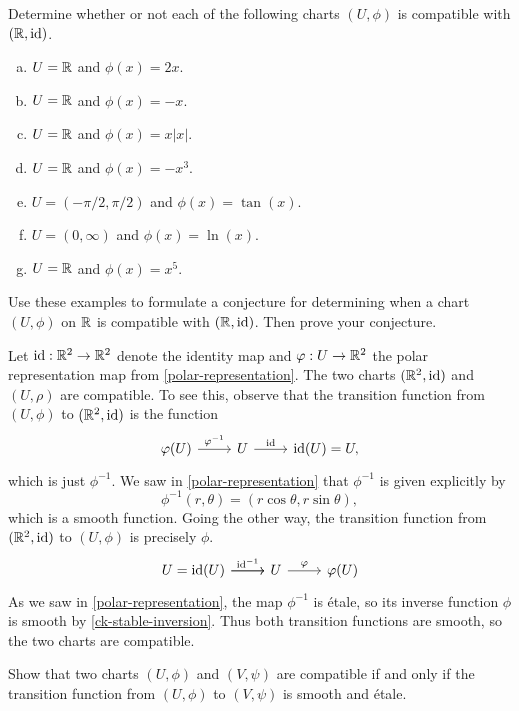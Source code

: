 \begin{exercise}
	Determine whether or not each of the following charts $(U, \phi)$ is compatible with $(\mathbb{R}, \mathrm{id})$.
	\begin{enumerate}[(a)]
		\item $U = \mathbb{R}$ and $\phi(x) = 2x$.
		\item $U = \mathbb{R}$ and $\phi(x) = -x$. 
		\item $U = \mathbb{R}$ and $\phi(x) = x|x|$. 
		\item $U = \mathbb{R}$ and $\phi(x) = -x^3$. 
		\item $U = (-\pi/2, \pi/2)$ and $\phi(x) = \tan(x)$. 
		\item $U = (0, \infty)$ and $\phi(x) = \ln(x)$. 
		\item $U = \mathbb{R}$ and $\phi(x) = x^5$. 
	\end{enumerate}
	Use these examples to formulate a conjecture for determining when a chart $(U, \phi)$ on $\mathbb{R}$ is compatible with $(\mathbb{R}, \mathrm{id})$. Then prove your conjecture. 
\end{exercise}

\begin{example} \label{polar-compatible-with-identity}
	Let $\mathrm{id} : \mathbb{R}^2 \to \mathbb{R}^2$ denote the identity map and $\varphi : U \to \mathbb{R}^2$ the polar representation map from \cref{polar-representation}. The two charts $(\mathbb{R}^2, \mathrm{id})$ and $(U, \rho)$ are compatible. To see this, observe that the transition function from $(U, \phi)$ to $(\mathbb{R}^2, \mathrm{id})$ is the function
	\[ \begin{tikzcd} \phi(U) \ar{r}{\phi^{-1}} & U \ar{r}{\id} & \id(U) = U, \end{tikzcd} \]
	which is just $\phi^{-1}$. We saw in \cref{polar-representation} that $\phi^{-1}$ is given explicitly by \[ \phi^{-1}(r, \theta) = (r\cos\theta, r\sin\theta), \]
	which is a smooth function. Going the other way, the transition function from $(\mathbb{R}^2, \mathrm{id})$ to $(U, \phi)$ is precisely $\phi$. 
	\[ \begin{tikzcd} U = \id(U) \ar{r}{\id^{-1}} \ar{r} & U \ar{r}{\phi} & \phi(U) \end{tikzcd} \]
	As we saw in \cref{polar-representation}, the map $\phi^{-1}$ is \'etale, so its inverse function $\phi$ is smooth by \cref{ck-stable-inversion}. Thus both transition functions are smooth, so the two charts are compatible. 
\end{example}

\begin{exercise}
	Show that two charts $(U,\phi)$ and $(V, \psi)$ are compatible if and only if the transition function from $(U, \phi)$ to $(V,\psi)$ is smooth and \'etale. 
\end{exercise}

